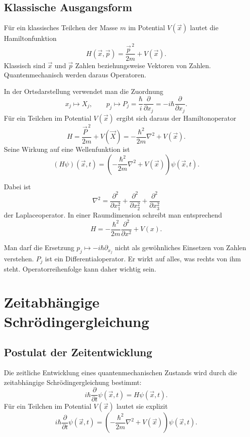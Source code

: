 \subsection{Klassische Ausgangsform}

Für ein klassisches Teilchen der Masse $m$ im Potential $V(\vec{x})$ lautet die Hamiltonfunktion
\[
    H(\vec{x},\vec{p})
    =\frac{\vec{p}^{\,2}}{2m}+V(\vec{x}).
\]
Klassisch sind $\vec{x}$ und $\vec{p}$ Zahlen beziehungsweise Vektoren von Zahlen. Quantenmechanisch werden daraus Operatoren.

\begin{definitionbox}
In der Ortsdarstellung verwendet man die Zuordnung
\[
    x_j \longmapsto X_j,
    \qquad
    p_j \longmapsto P_j=\frac{\hbar}{i}\frac{\partial}{\partial x_j}
    =-i\hbar\frac{\partial}{\partial x_j}.
\]
Für ein Teilchen im Potential $V(\vec{x})$ ergibt sich daraus der Hamiltonoperator
\[
    H
    =\frac{\vec{P}^{\,2}}{2m}+V(\vec{X})
    =-\frac{\hbar^2}{2m}\nabla^2+V(\vec{x}).
\]
Seine Wirkung auf eine Wellenfunktion ist
\[
    (H\psi)(\vec{x},t)
    =\left(-\frac{\hbar^2}{2m}\nabla^2+V(\vec{x})\right)\psi(\vec{x},t).
\]
\end{definitionbox}

Dabei ist
\[
    \nabla^2
    =\frac{\partial^2}{\partial x_1^2}
     +\frac{\partial^2}{\partial x_2^2}
     +\frac{\partial^2}{\partial x_3^2}
\]
der Laplaceoperator. In einer Raumdimension schreibt man entsprechend
\[
    H=-\frac{\hbar^2}{2m}\frac{\partial^2}{\partial x^2}+V(x).
\]

\begin{notebox}
Man darf die Ersetzung $p_j\mapsto -i\hbar\partial_{x_j}$ nicht als gewöhnliches Einsetzen von Zahlen verstehen. $P_j$ ist ein Differentialoperator. Er wirkt auf alles, was rechts von ihm steht. Operatorreihenfolge kann daher wichtig sein.
\end{notebox}

\section{Zeitabhängige Schrödingergleichung}

\subsection{Postulat der Zeitentwicklung}

\begin{definitionbox}
Die zeitliche Entwicklung eines quantenmechanischen Zustands wird durch die zeitabhängige Schrödingergleichung bestimmt:
\[
    i\hbar\frac{\partial}{\partial t}\psi(\vec{x},t)
    =H\psi(\vec{x},t).
\]
Für ein Teilchen im Potential $V(\vec{x})$ lautet sie explizit
\[
    i\hbar\frac{\partial}{\partial t}\psi(\vec{x},t)
    =\left(-\frac{\hbar^2}{2m}\nabla^2+V(\vec{x})\right)\psi(\vec{x},t).
\]
\end{definitionbox}

